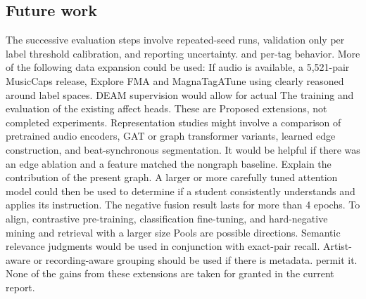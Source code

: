 \documentclass[10pt,twocolumn,letterpaper]{article}
\begin{document}
\subsection{Future work}
The successive evaluation steps involve repeated-seed runs, validation only per label threshold calibration, and reporting uncertainty. and per-tag behavior. More of the following data expansion could be used: If audio is available, a 5,521-pair MusicCaps release, Explore FMA and MagnaTagATune using clearly reasoned around label spaces. DEAM supervision would allow for actual The training and evaluation of the existing affect heads. These are Proposed extensions, not completed experiments. Representation studies might involve a comparison of pretrained audio encoders, GAT or graph transformer variants, learned edge construction, and beat-synchronous segmentation. It would be helpful if there was an edge ablation and a feature matched the nongraph baseline. Explain the contribution of the present graph. A larger or more carefully tuned attention model could then be used to determine if a student consistently understands and applies its instruction. The negative fusion result lasts for more than 4 epochs. To align, contrastive pre-training, classification fine-tuning, and hard-negative mining and retrieval with a larger size Pools are possible directions. Semantic relevance judgments would be used in conjunction with exact-pair recall. Artist-aware or recording-aware grouping should be used if there is metadata. permit it. None of the gains from these extensions are taken for granted in the current report.
\end{document}
